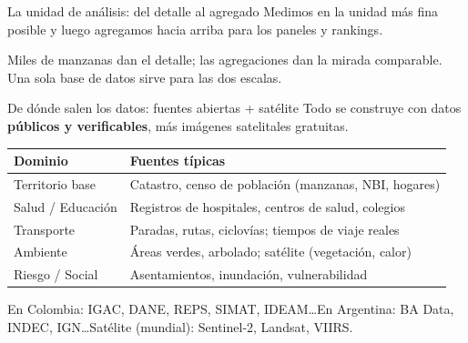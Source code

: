 \documentclass[aspectratio=169,11pt]{beamer}
\newcommand{\lead}[1]{{\color{tPrimary}\large #1}\par\medskip}
\begin{document}
\begin{frame}{La unidad de análisis: del detalle al agregado}
\lead{Medimos en la unidad más fina posible y luego agregamos hacia arriba para los paneles y rankings.}
\centering\medskip
{}
\vfill
{\footnotesize\color{tMuted} Miles de manzanas dan el detalle; las agregaciones dan la mirada comparable. Una sola base de datos sirve para las dos escalas.}
\end{frame}

\begin{frame}{De dónde salen los datos: fuentes abiertas + satélite}
\lead{Todo se construye con datos \textbf{públicos y verificables}, más imágenes satelitales gratuitas.}
\centering\small
\begin{tabular}{@{}>{\raggedright}p{3.3cm} p{8.2cm}@{}}
\toprule
{\color{tAccent}\textbf{Dominio}} & {\color{tAccent}\textbf{Fuentes típicas}}\\
\midrule
Territorio base & Catastro, censo de población (manzanas, NBI, hogares)\\
Salud / Educación & Registros de hospitales, centros de salud, colegios\\
Transporte & Paradas, rutas, ciclovías; tiempos de viaje reales\\
Ambiente & Áreas verdes, arbolado; satélite (vegetación, calor)\\
Riesgo / Social & Asentamientos, inundación, vulnerabilidad\\
\bottomrule
\end{tabular}
\vfill
{\footnotesize\color{tMuted} En Colombia: IGAC, DANE, REPS, SIMAT, IDEAM\dots\quad En Argentina: BA Data, INDEC, IGN\dots\quad Satélite (mundial): Sentinel-2, Landsat, VIIRS.}
\end{frame}
\end{document}
